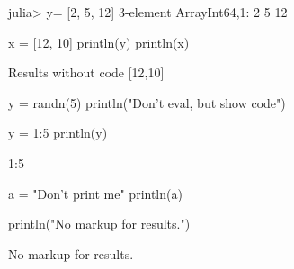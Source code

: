 

\begin{juliaterm}
julia> y= [2, 5, 12]
3-element Array{Int64,1}:
  2
  5
 12

\end{juliaterm}



\begin{juliacode}
x = [12, 10]
println(y)
println(x)
\end{juliacode}
\begin{juliaout}
[2,5,12]
[12,10]
\end{juliaout}




\begin{juliaout}
Results without code
[12,10]
\end{juliaout}




\begin{juliacode}
y = randn(5)
println("Don't eval, but show code")
\end{juliacode}



\begin{juliacode}
y = 1:5
println(y)
\end{juliacode}
\begin{juliaout}
1:5
\end{juliaout}



\begin{juliacode}
a = "Don't print me"
println(a)
\end{juliacode}



\begin{juliacode}
println("No markup for results.")
\end{juliacode}

No markup for results.

